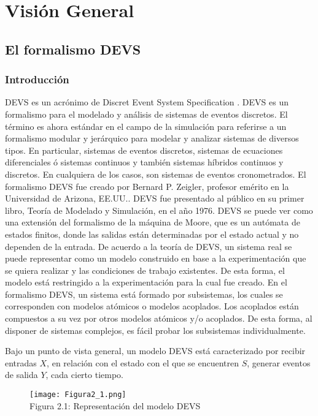 \chapter{Visión General}

\section{El formalismo DEVS}

\subsection{Introducción}
DEVS es un acrónimo de Discret Event System Specification \cite{Zeigler2000}. DEVS es un formalismo para el modelado y análisis de sistemas de eventos discretos. El término es ahora estándar en el campo de la simulación para referirse a un formalismo modular y jerárquico para modelar y analizar sistemas de diversos tipos. En particular, sistemas de eventos discretos, sistemas de ecuaciones diferenciales ó sistemas continuos y también sistemas híbridos continuos y discretos. En cualquiera de los casos, son sistemas de eventos cronometrados.
El formalismo DEVS fue creado por Bernard P. Zeigler, profesor emérito en la Universidad de Arizona, EE.UU.. DEVS fue presentado al público en su primer libro, Teoría de Modelado y Simulación, en el año  1976. DEVS se puede ver como una extensión del formalismo de la máquina de Moore, que es un autómata de estados finitos, donde las salidas están determinadas por el estado actual y no dependen de la entrada. De acuerdo a la teoría de DEVS, un sistema real se puede representar como un modelo construido en base a la experimentación que se quiera realizar y las condiciones de trabajo existentes. De esta forma, el modelo está restringido a la experimentación para la cual fue creado.
En el formalismo DEVS, un sistema está formado por subsistemas, los cuales se corresponden con modelos atómicos o modelos acoplados. Los acoplados están compuestos a su vez por otros modelos atómicos y/o acoplados. De esta forma, al disponer de sistemas complejos, es fácil probar los subsistemas individualmente.

Bajo un punto de vista general, un modelo DEVS está caracterizado por recibir entradas $X$, en relación con el estado con el que se encuentren $S$, generar eventos de salida $Y$, cada cierto tiempo.

\begin{figure}[!ht]
\begin{center}
\texttt{[image: Figura2\_1.png]}\\[0.5cm]
Figura 2.1: Representación del modelo DEVS
\end{center}
\end{figure}
\bigskip

